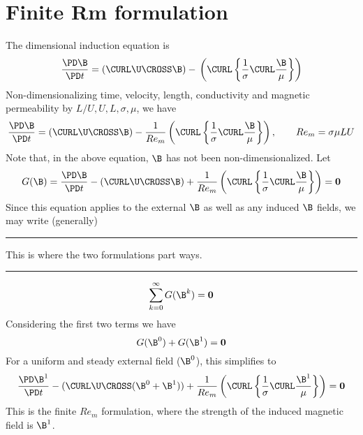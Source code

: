\documentclass[11pt]{article}
\begin{document}
\doublespacing
\MOONSTITLE

\section{Finite Rm formulation}
The dimensional induction equation is
\begin{equation}
  \frac{\PD \B}{\PD t}
  =
  (\CURL \U \CROSS \B)
  - \\
  \left(
  \CURL
  \left\{
  \frac{1}{\sigma}
  \CURL
  \frac{\B}{\mu}
  \right\}
  \right)
\end{equation}
Non-dimensionalizing time, velocity, length, conductivity and magnetic permeability by $L/U,U,L,\sigma,\mu$, we have
\begin{equation}
  \frac{\PD \B}{\PD t}
  =
  (\CURL \U \CROSS \B)
  - \\
  \frac{1}{Re_m}
  \left(
  \CURL
  \left\{
  \frac{1}{\sigma}
  \CURL
  \frac{\B}{\mu}
  \right\}
  \right)
  ,\qquad Re_m = \sigma \mu LU
\end{equation}
Note that, in the above equation, $\B$ has not been non-dimensionalized. Let
\begin{equation}
  G(\B)
  =
  \frac{\PD \B}{\PD t}
  -
  (\CURL \U \CROSS \B)
  +
  \frac{1}{Re_m}
  \left(
  \CURL
  \left\{
  \frac{1}{\sigma}
  \CURL
  \frac{\B}{\mu}
  \right\}
  \right)
  =
  \mathbf{0}
\end{equation}
Since this equation applies to the external $\B$ as well as any induced $\B$ fields, we may write (generally)

\noindent
\rule{\textwidth}{1pt}
\begin{center}
This is where the two formulations part ways.
\end{center}
\noindent
\rule{\textwidth}{1pt}
\begin{equation}
	\sum_{k=0}^{\infty} G(\B^k) = \mathbf{0}
\end{equation}
Considering the first two terms we have
\begin{equation}
  G(\B^0) + G(\B^1) = \mathbf{0}
\end{equation}
For a uniform and steady external field ($\B^0$), this simplifies to
\begin{equation}
  \frac{\PD \B^1}{\PD t}
  -
  (\CURL \U \CROSS (\B^0 + \B^1))
  +
  \frac{1}{Re_m}
  \left(
  \CURL
  \left\{
  \frac{1}{\sigma}
  \CURL
  \frac{\B^1}{\mu}
  \right\}
  \right)
  =
  \mathbf{0}
\end{equation}
This is the finite $Re_m$ formulation, where the strength of the induced magnetic field is $\B^1$.
\end{document}
